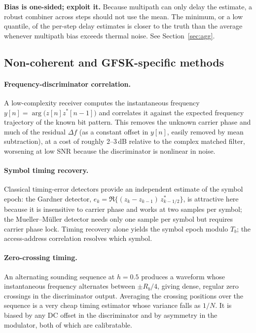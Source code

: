 \documentclass[11pt,a4paper]{article}
\begin{document}
\begin{callout}
\textbf{Bias is one-sided; exploit it.} Because multipath can only delay the estimate, a robust
combiner across steps should not use the mean. The minimum, or a low quantile, of the per-step
delay estimates is closer to the truth than the average whenever multipath bias exceeds thermal
noise. See Section~\ref{sec:agg}.
\end{callout}

\subsection{Non-coherent and GFSK-specific methods}
\label{sec:gfsk}

\paragraph{Frequency-discriminator correlation.} A low-complexity receiver computes the instantaneous
frequency $y[n] = \arg\bigl(z[n]z^{*}[n-1]\bigr)$ and correlates it against the expected frequency
trajectory of the known bit pattern. This removes the unknown carrier phase and much of the residual
$\Delta f$ (as a constant offset in $y[n]$, easily removed by mean subtraction), at a cost of
roughly 2--3\,dB relative to the complex matched filter, worsening at low SNR because the
discriminator is nonlinear in noise.

\paragraph{Symbol timing recovery.} Classical timing-error detectors provide an independent estimate
of the symbol epoch: the Gardner detector, $e_k = \Re\{(z_k - z_{k-1})\,z^{*}_{k-1/2}\}$, is
attractive here because it is insensitive to carrier phase and works at two samples per symbol; the
Mueller--M\"uller detector needs only one sample per symbol but requires carrier phase lock. Timing
recovery alone yields the symbol epoch modulo $T_b$; the access-address correlation resolves which
symbol.

\paragraph{Zero-crossing timing.} An alternating sounding sequence at $h=0.5$ produces a waveform
whose instantaneous frequency alternates between $\pm R_b/4$, giving dense, regular zero crossings
in the discriminator output. Averaging the crossing positions over the sequence is a very cheap
timing estimator whose variance falls as $1/N$. It is biased by any DC offset in the discriminator
and by asymmetry in the modulator, both of which are calibratable.
\end{document}

